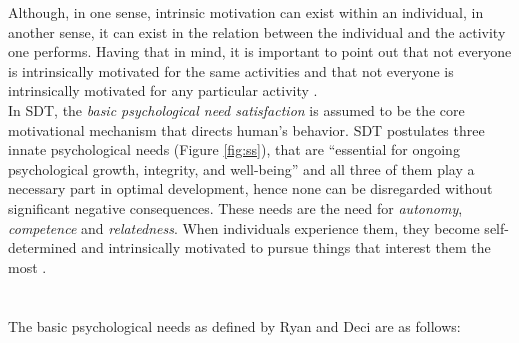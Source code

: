 Although, in one sense, intrinsic motivation can exist within an individual, in another sense, it can exist in the relation between the individual and the activity one performs. Having that in mind, it is important to point out that not everyone is intrinsically motivated for the same activities and that not everyone is intrinsically motivated for any particular activity \cite{ryan2000intrinsic}. \\In SDT, the \textit{basic psychological need satisfaction} is assumed to be the core motivational mechanism that directs human's behavior. SDT postulates three innate psychological needs (Figure \ref{fig:ss}), that are ``essential for ongoing psychological growth, integrity, and well-being'' and all three of them play a necessary part in optimal development, hence none can be disregarded without significant negative consequences. These needs are the need for \textit{autonomy}, \textit{competence} and \textit{relatedness}. When individuals experience them, they become self-determined and intrinsically motivated to pursue things that interest them the most \cite{deci2000and}.\\\\\\ %
The basic psychological needs as defined by Ryan and Deci are as follows:
